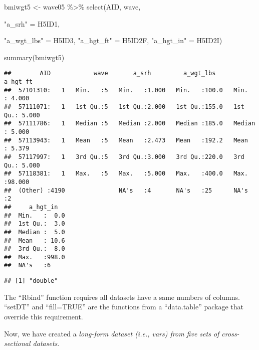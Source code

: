 \documentclass[
]{book}
\newenvironment{Shaded}{\begin{snugshade}}{\end{snugshade}}
\newcommand{\FunctionTok}[1]{\textcolor[rgb]{0.00,0.00,0.00}{#1}}
\newcommand{\NormalTok}[1]{#1}
\newcommand{\OtherTok}[1]{\textcolor[rgb]{0.56,0.35,0.01}{#1}}
\newcommand{\SpecialCharTok}[1]{\textcolor[rgb]{0.00,0.00,0.00}{#1}}
\newcommand{\StringTok}[1]{\textcolor[rgb]{0.31,0.60,0.02}{#1}}
\begin{document}
\begin{Shaded}
\begin{Highlighting}[]
\NormalTok{bmiwgt5 }\OtherTok{\textless{}{-}}\NormalTok{ wave05 }\SpecialCharTok{\%\textgreater{}\%}
  \FunctionTok{select}\NormalTok{(AID,}
\NormalTok{         wave,}
         
         \StringTok{"a\_srh"} \OtherTok{=}\NormalTok{ H5ID1,}
         
         \StringTok{"a\_wgt\_lbs"} \OtherTok{=}\NormalTok{ H5ID3,}
         \StringTok{"a\_hgt\_ft"} \OtherTok{=}\NormalTok{ H5ID2F,}
         \StringTok{"a\_hgt\_in"} \OtherTok{=}\NormalTok{ H5ID2I)}

\FunctionTok{summary}\NormalTok{(bmiwgt5)}
\end{Highlighting}
\end{Shaded}

\begin{verbatim}
##        AID            wave       a_srh         a_wgt_lbs        a_hgt_ft     
##  57101310:   1   Min.   :5   Min.   :1.000   Min.   :100.0   Min.   : 4.000  
##  57111071:   1   1st Qu.:5   1st Qu.:2.000   1st Qu.:155.0   1st Qu.: 5.000  
##  57111786:   1   Median :5   Median :2.000   Median :185.0   Median : 5.000  
##  57113943:   1   Mean   :5   Mean   :2.473   Mean   :192.2   Mean   : 5.379  
##  57117997:   1   3rd Qu.:5   3rd Qu.:3.000   3rd Qu.:220.0   3rd Qu.: 5.000  
##  57118381:   1   Max.   :5   Max.   :5.000   Max.   :400.0   Max.   :98.000  
##  (Other) :4190               NA's   :4       NA's   :25      NA's   :2       
##     a_hgt_in    
##  Min.   :  0.0  
##  1st Qu.:  3.0  
##  Median :  5.0  
##  Mean   : 10.6  
##  3rd Qu.:  8.0  
##  Max.   :998.0  
##  NA's   :6
\end{verbatim}

\begin{Shaded}
\end{Shaded}

\begin{verbatim}
## [1] "double"
\end{verbatim}

The ``Rbind'' function requires all datasets have a same numbers of columns. ``setDT'' and ``fill=TRUE'' are the functions from a ``data.table'' package that override this requirement.

Now, we have created a \emph{long-form dataset (i.e., vars) from five sets of cross-sectional datasets}.
\end{document}
